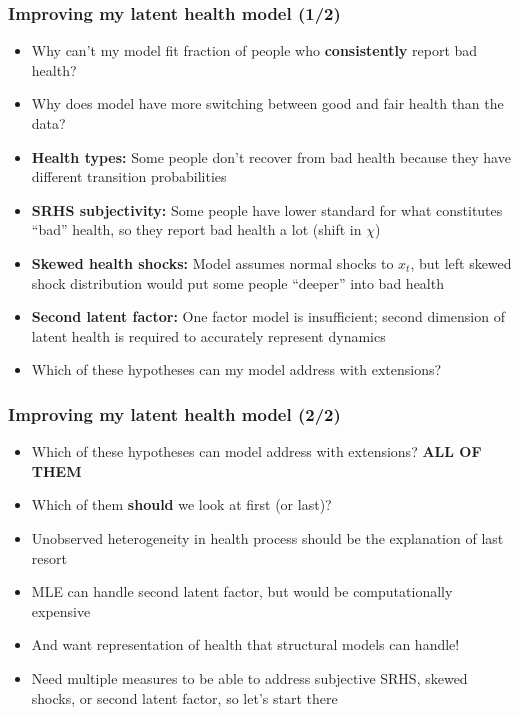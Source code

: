 \documentclass[aspectratio=169]{beamer}
\begin{document}
\begin{frame}\frametitle{Improving my latent health model (1/2)}
\begin{itemize}
	\item <1->Why can't my model fit fraction of people who \textbf{consistently} report bad health?
	
	\item <1->Why does model have more switching between good and fair health than the data?
	
	\item <2->\textbf{Health types:} Some people don't recover from bad health because they have different transition probabilities
		
	\item <3->\textbf{SRHS subjectivity:} Some people have lower standard for what constitutes ``bad'' health, so they report bad health a lot (shift in $\chi$)
		
	\item <4->\textbf{Skewed health shocks:} Model assumes normal shocks to $x_t$, but left skewed shock distribution would put some people ``deeper'' into bad health
	
	\item <5->\textbf{Second latent factor:} One factor model is insufficient; second dimension of latent health is required to accurately represent dynamics
	
	\item <6->Which of these hypotheses can my model address with extensions?
\end{itemize}
\end{frame}


\begin{frame}\frametitle{Improving my latent health model (2/2)}
\begin{itemize}
	\item <1->Which of these hypotheses can model address with extensions? \textbf{ALL OF THEM}
	
	\item <1->Which of them \textbf{should} we look at first (or last)?
	
	\item <2->Unobserved heterogeneity in health process should be the explanation of last resort
	
	\item <3->MLE can handle second latent factor, but would be computationally expensive
	
	\item <3->And want representation of health that structural models can handle!
	
	\item <4->Need multiple measures to be able to address subjective SRHS, skewed shocks, or second latent factor, so let's start there
\end{itemize}
\end{frame}
\end{document}
